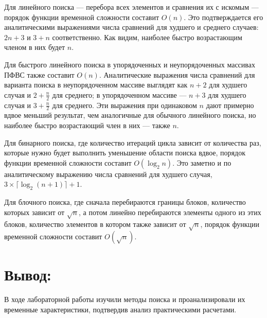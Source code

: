 \documentclass[12pt]{article}
\begin{document}
{	Для линейного поиска --- перебора всех элементов и сравнения их с искомым --- порядок функции временной сложности составит $O(n)$. Это подтверждается его аналитическими выражениями числа сравнений для худшего и среднего случаев: $2n + 3$ и $3 + n$ соответственно. Как видим, наиболее быстро возрастающим членом в них будет $n$.
	
	Для быстрого линейного поиска в упорядоченных и неупорядоченных массивах ПФВС также составит $O(n)$. Аналитические выражения числа сравнений для варианта поиска в неупорядоченном массиве выглядят как $n + 2$ для худшего случая и $2 + \frac{n}{2}$ для среднего; в упорядоченном массиве --- $n + 3$ для худшего случая и $3 + \frac{n}{2}$ для среднего. Эти выражения при одинаковом $n$ дают примерно вдвое меньший результат, чем аналогичные для обычного линейного поиска, но наиболее быстро возрастающий член в них --- также $n$. 
	
	Для бинарного поиска, где количество итераций цикла зависит от количества раз, которые нужно будет выполнить уменьшение области поиска вдвое, порядок функции временной сложности составит $O(\log_2{n})$. Это заметно и по аналитическому выражению числа сравнений для худшего случая, $3\times\lceil \log_2{(n+1)}\rceil + 1$.
	
	Для блочного поиска, где сначала перебираются границы блоков, количество которых зависит от $\sqrt{n}$, а потом линейно перебираются элементы одного из этих блоков, количество элементов в котором также зависит от $\sqrt{n}$, порядок функции временной сложности составит $O(\sqrt{n})$.
	
	\section{Вывод:}
	В ходе лабораторной работы изучили методы поиска и проанализировали их временные характеристики, подтвердив анализ практическими расчетами. 
	
}
\end{document}

